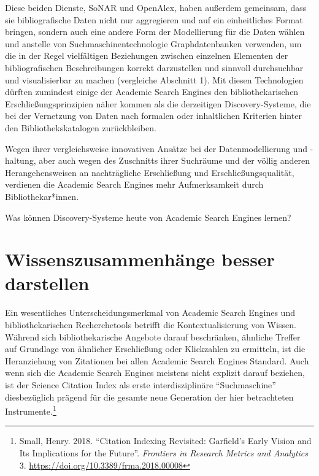 \documentclass[a4paper,
fontsize=11pt,
oneside,
numbers=noperiodatend,
parskip=half-,
bibliography=totoc,
final
]{scrartcl}
\begin{document}
Diese beiden Dienste, SoNAR und OpenAlex, haben außerdem gemeinsam, dass
sie bibliografische Daten nicht nur aggregieren und auf ein
einheitliches Format bringen, sondern auch eine andere Form der
Modellierung für die Daten wählen und anstelle von
Suchmaschinentechnologie Graphdatenbanken verwenden, um die in der Regel
vielfältigen Beziehungen zwischen einzelnen Elementen der
bibliografischen Beschreibungen korrekt darzustellen und sinnvoll
durchsuchbar und visualisierbar zu machen (vergleiche Abschnitt 1). Mit
diesen Technologien dürften zumindest einige der Academic Search Engines
den bibliothekarischen Erschließungsprinzipien näher kommen als die
derzeitigen Discovery-Systeme, die bei der Vernetzung von Daten nach
formalen oder inhaltlichen Kriterien hinter den Bibliothekskatalogen
zurückbleiben.

Wegen ihrer vergleichsweise innovativen Ansätze bei der
Datenmodellierung und -haltung, aber auch wegen des Zuschnitts ihrer
Suchräume und der völlig anderen Herangehensweisen an nachträgliche
Erschließung und Erschließungsqualität, verdienen die Academic Search
Engines mehr Aufmerksamkeit durch Bibliothekar*innen.

Was können Discovery-Systeme heute von Academic Search Engines lernen?

\hypertarget{wissenszusammenhuxe4nge-besser-darstellen}{%
\section{Wissenszusammenhänge besser
darstellen}\label{wissenszusammenhuxe4nge-besser-darstellen}}

Ein wesentliches Unterscheidungsmerkmal von Academic Search Engines und
bibliothekarischen Recherchetools betrifft die Kontextualisierung von
Wissen. Während sich bibliothekarische Angebote darauf beschränken,
ähnliche Treffer auf Grundlage von ähnlicher Erschließung oder
Klickzahlen zu ermitteln, ist die Heranziehung von Zitationen bei allen
Academic Search Engines Standard. Auch wenn sich die Academic Search
Engines meistens nicht explizit darauf beziehen, ist der Science
Citation Index als erste interdisziplinäre \enquote{Suchmaschine}
diesbezüglich prägend für die gesamte neue Generation der hier
betrachteten Instrumente.\footnote{Small, Henry. 2018. \enquote{Citation
  Indexing Revisited: Garfield's Early Vision and Its Implications for
  the Future}. \emph{Frontiers in Research Metrics and Analytics} 3.
  \url{https://doi.org/10.3389/frma.2018.00008}}
\end{document}
